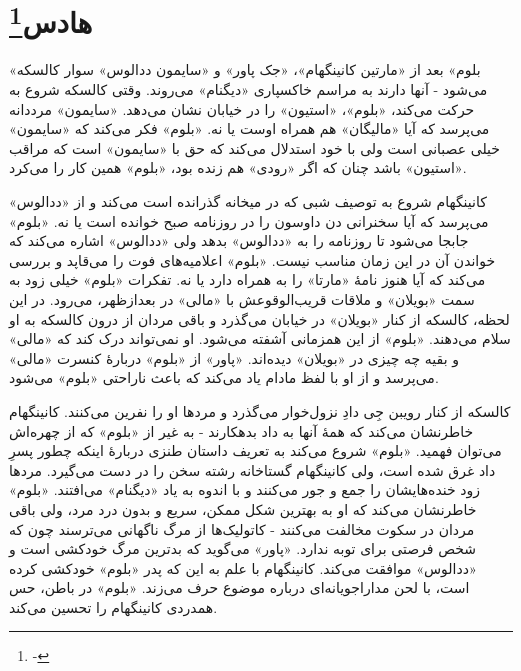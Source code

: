 \documentclass[12pt]{book}
\newcommand{\noun}[1]{«{#1}»}
\begin{document}
    \chapter[هادس]{هادس\protect\footnote{-}}\label{ep:6}
    \noun{بلوم} بعد از \noun{مارتین کانینگهام}، \noun{جک پاور} و \noun{سایمون ددالوس‬} سوار کالسکه می‌شود - آنها دارند به مراسم خاکسپاری \noun{دیگنام} می‌روند. وقتی کالسکه شروع به حرکت می‌کند، \noun{بلوم}، \noun{استیون} را در خیابان نشان می‌دهد. \noun{سایمون}  مرددانه می‌پرسد که آیا \noun{مالیگان} هم همراه اوست یا نه. \noun{بلوم} فکر می‌کند که \noun{سایمون}  خیلی عصبانی است ولی با خود استدلال می‌کند که حق با \noun{سایمون}  است که مراقب \noun{استیون} باشد چنان که اگر \noun{رودی} هم زنده بود، \noun{بلوم} همین کار را می‌کرد.

    کانینگهام شروع به توصیف شبی که در میخانه گذرانده است می‌کند و از \noun{ددالوس} می‌پرسد که آیا سخنرانی دن داوسون را در روزنامه صبح خوانده است یا نه. \noun{بلوم} جابجا می‌شود تا روزنامه را به \noun{ددالوس} بدهد ولی \noun{ددالوس} اشاره می‌کند که خواندن آن در این زمان مناسب نیست. \noun{بلوم} اعلامیه‌های فوت را می‌قاپد و بررسی می‌کند که آیا هنوز نامۀ \noun{مارتا} را به همراه دارد یا نه. تفکرات \noun{بلوم} خیلی زود به سمت \noun{بویلان} و ملاقات قریب‌الوقوعش با \noun{مالی} در بعدازظهر، می‌رود. در این لحظه، کالسکه از کنار \noun{بویلان} در خیابان می‌گذرد و باقی مردان از درون کالسکه به او سلام می‌دهند. \noun{بلوم} از این همزمانی آشفته می‌شود. او نمی‌تواند درک کند که \noun{مالی} و بقیه چه چیزی در \noun{بویلان} دیده‌اند. \noun{پاور} از \noun{بلوم} دربارۀ کنسرت \noun{مالی} می‌پرسد و از او با لفظ مادام یاد می‌کند که باعث ناراحتی \noun{بلوم} می‌شود.

    کالسکه از کنار رویبن جِی دادِ نزول‌خوار می‌گذرد و مردها او را نفرین می‌کنند. کانینگهام خاطرنشان می‌کند که همۀ آنها به داد بدهکارند - به غیر از \noun{بلوم} که از چهره‌اش می‌توان فهمید. \noun{بلوم} شروع می‌کند به تعریف داستان طنزی دربارۀ اینکه چطور پسرِ داد غرق شده است، ولی کانینگهام گستاخانه رشته سخن را در دست می‌گیرد. مردها زود خنده‌هایشان را جمع و جور می‌کنند و با اندوه به یاد \noun{دیگنام} می‌افتند. \noun{بلوم} خاطرنشان می‌کند که او به بهترین شکل ممکن، سریع و بدون درد مرد، ولی باقی مردان در سکوت مخالفت می‌کنند - کاتولیک‌ها از مرگ ناگهانی می‌ترسند چون که شخص فرصتی برای توبه ندارد. \noun{پاور} می‌گوید که بدترین مرگ خودکشی است و \noun{ددالوس} موافقت می‌کند. کانینگهام با علم به این که پدر \noun{بلوم} خودکشی کرده است، با لحن مداراجویانه‌ای درباره موضوع حرف می‌زند. \noun{بلوم} در باطن، حس همدردی کانینگهام را تحسین می‌کند.
\end{document}
